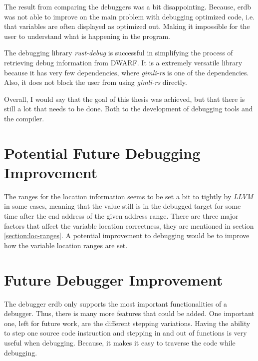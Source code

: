

The result from comparing the debuggers was a bit disappointing.
Because, \gls{erdb} was not able to improve on the main problem with debugging optimized code, i.e. that variables are often displayed as optimized out.
Making it impossible for the user to understand what is happening in the program.


The debugging library \emph{rust-debug} is successful in simplifying the process of retrieving debug information from \gls{DWARF}.
It is a extremely versatile library because it has very few dependencies, where \emph{gimli-rs} is one of the dependencies.
Also, it does not block the user from using \emph{gimli-rs} directly.


Overall, I would say that the goal of this thesis was achieved, but that there is still a lot that needs to be done.
Both to the development of debugging tools and the compiler.


\section{Potential Future Debugging Improvement}
The ranges for the location information seems to be set a bit to tightly by \emph{LLVM} in some cases, meaning that the value still is in the debugged target for some time after the end address of the given address range.
There are three major factors that affect the variable location correctness, they are mentioned in section \ref{section:loc-ranges}.
A potential improvement to debugging would be to improve how the variable location ranges are set.


\section{Future Debugger Improvement}
The debugger \gls{erdb} only supports the most important functionalities of a debugger.
Thus, there is many more features that could be added.
One important one, left for future work, are the different stepping variations.
Having the ability to step one source code instruction and stepping in and out of functions is very useful when debugging.
Because, it makes it easy to traverse the code while debugging.



